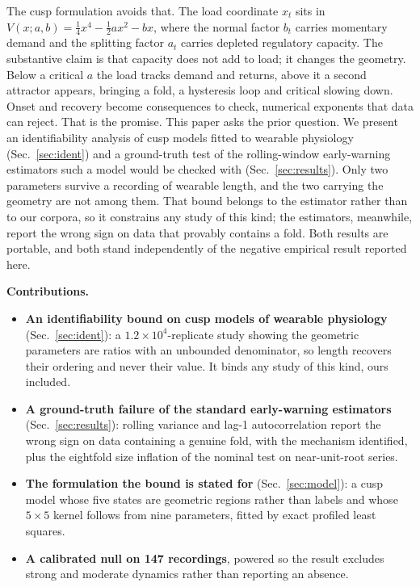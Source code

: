 \documentclass[conference]{IEEEtran}
\begin{document}
The cusp formulation avoids that. The load coordinate $x_t$ sits in
$V(x;a,b)=\tfrac14 x^4-\tfrac12 a x^2-bx$, where the normal factor $b_t$
carries momentary demand and the splitting factor $a_t$ carries depleted
regulatory capacity. The substantive claim is that capacity does not add to
load; it changes the geometry. Below a critical $a$ the load tracks demand and
returns, above it a second attractor appears, bringing a fold, a hysteresis
loop and critical slowing down. Onset and recovery become consequences to
check, numerical exponents that data can reject. That is the promise. This paper asks the prior question. We present an identifiability analysis of cusp models fitted to wearable
physiology (Sec.~\ref{sec:ident}) and a ground-truth test of the rolling-window
early-warning estimators such a model would be checked with
(Sec.~\ref{sec:results}). Only two parameters survive a recording of
wearable length, and the two carrying the geometry are not among them. That
bound belongs to the estimator rather than to our corpora, so it constrains any
study of this kind; the estimators, meanwhile, report the wrong sign on data
that provably contains a fold. Both results are portable, and both stand
independently of the negative empirical result reported here.

\noindent\textbf{Contributions.}
\begin{itemize}[leftmargin=1.2em,itemsep=2pt,topsep=3pt,parsep=0pt]
\item \textbf{An identifiability bound on cusp models of wearable
  physiology} (Sec.~\ref{sec:ident}): a $1.2\times10^{4}$-replicate study
  showing the geometric parameters are ratios with an unbounded denominator, so
  length recovers their ordering and never their value. It binds any study of
  this kind, ours included.
\item \textbf{A ground-truth failure of the standard early-warning estimators}
  (Sec.~\ref{sec:results}): rolling variance and lag-1 autocorrelation report
  the wrong sign on data containing a genuine fold, with the mechanism
  identified, plus the eightfold size inflation of the nominal test on
  near-unit-root series.
\item \textbf{The formulation the bound is stated for} (Sec.~\ref{sec:model}):
  a cusp model whose five states are geometric regions rather than labels and
  whose $5\times5$ kernel follows from nine parameters, fitted by exact
  profiled least squares.
\item \textbf{A calibrated null on 147 recordings}, powered so the result
  excludes strong and moderate dynamics rather than reporting an absence.
\end{itemize}
\end{document}
